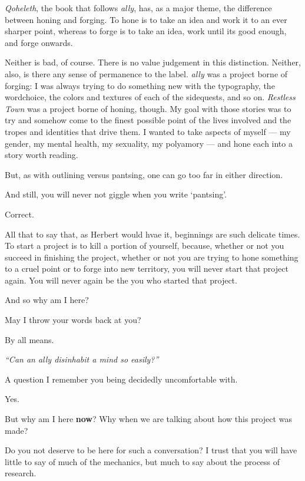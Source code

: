 \begin{paracol}{2}
\begin{leftcolumn}
\emph{Qoheleth}, the book that follows \emph{ally}, has, as a major theme, the difference between honing and forging. To hone is to take an idea and work it to an ever sharper point, whereas to forge is to take an idea, work until its good enough, and forge onwards. 

Neither is bad, of course. There is no value judgement in this distinction. Neither, also, is there any sense of permanence to the label. \emph{ally} was a project borne of forging: I was always trying to do something new with the typography, the wordchoice, the colors and textures of each of the sidequests, and so on. \emph{Restless Town} was a project borne of honing, though. My goal with those stories was to try and somehow come to the finest possible point of the lives involved and the tropes and identities that drive them. I wanted to take aspects of myself --- my gender, my mental health, my sexuality, my polyamory --- and hone each into a story worth reading.

But, as with outlining versus pantsing, one can go too far in either direction.

\begin{ally}
  And still, you will never not giggle when you write `pantsing'.
\end{ally}
Correct.

All that to say that, as Herbert would hvae it, beginnings are such delicate times. To start a project is to kill a portion of yourself, because, whether or not you succeed in finishing the project, whether or not you are trying to hone something to a cruel point or to forge into new territory, you will never start that project again. You will never again be the you who started that project.

\newpage

\begin{ally}
  And so why am I here?
\end{ally}
May I throw your words back at you?

\begin{ally}
  By all means.
\end{ally}
\emph{``Can an ally disinhabit a mind so easily?''}

\begin{ally}
  A question I remember you being decidedly uncomfortable with.
\end{ally}
Yes.

\begin{ally}
  But why am I here \textbf{now}? Why when we are talking about how this project was made?
\end{ally}
Do you not deserve to be here for such a conversation? I trust that you will have little to say of much of the mechanics, but much to say about the process of research.


\end{leftcolumn}
\end{paracol}
